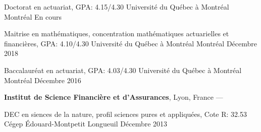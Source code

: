 
\begin{cventries}
  \cventry
    {Doctorat en actuariat, GPA: 4.15/4.30} %
    {Université du Québec à Montréal} %
    {Montréal} %
    {En cours} %
    {}
    
  \cventry
    {Maitrise en mathématiques, concentration mathématiques actuarielles et financières, GPA: 4.10/4.30} %
    {Université du Québec à Montréal} %
    {Montréal} %
    {Décembre 2018} %
    {}
    
  \cventry
    {Baccalauréat en actuariat, GPA: 4.03/4.30} %
    {Université du Québec à Montréal} %
    {Montréal} %
    {Décembre 2016} %
    {
      \begin{cvitems} %
         \item {\textbf{Institut de Science Financière et d'Assurances}, Lyon, France --- }
      \end{cvitems}
    }
    
  \cventry
    {DEC en siences de la nature, profil sciences pures et appliquées, Cote R: 32.53} %
    {Cégep Édouard-Montpetit} %
    {Longueuil} %
    {Décembre 2013} %
    {}
\end{cventries}
